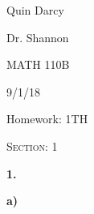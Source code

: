 \documentclass[12pt, a4paper]{article}
\begin{document}
  
 \begin{flushleft}
  
    Quin Darcy\par
    Dr. Shannon\par
    MATH 110B\par
    9/1/18
  
 \end{flushleft}
  
 \centerline{Homework: 1TH}
 
 \vspace{4mm}
 
 \noindent\textsc{Section: 1}\par
 
 \justifying
 
 \vspace{1mm}
 
 \hline
 
 \vspace{4mm}
 
 \noindent\textbf{1.}\par
 
 \vspace{4mm}
 
 \par\textbf{a)} 
 
 \vspace{2mm}
 
\end{document}
